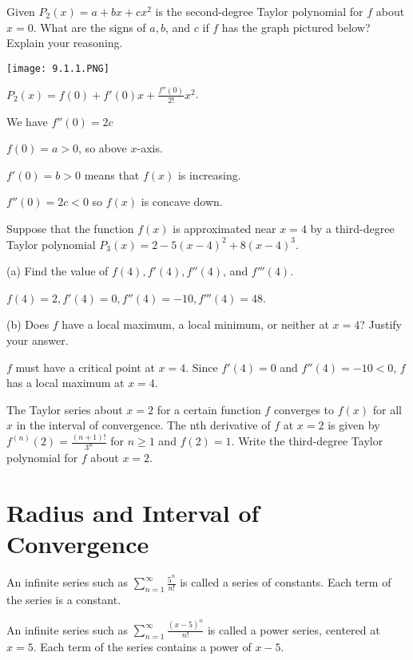 \documentclass[../bccalc.tex]{subfiles}
\begin{document}
\begin{example}
    Given $P_2(x)=a+bx+cx^2$ is the second-degree Taylor polynomial for $f$ about $x=0$. What are the signs of $a,b$, and $c$ if $f$ has the graph pictured below? Explain your reasoning.
    \begin{center}
        \texttt{[image: 9.1.1.PNG]}
    \end{center}

    $P_2(x)=f(0)+f'(0)x+\frac{f''(0)}{2!}x^2$.

    We have $f''(0)=2c$

    $f(0)=a>0$, so above $x$-axis.

    $f'(0)=b>0$ means that $f(x)$ is increasing.

    $f''(0)=2c<0$ so $f(x)$ is concave down.
\end{example}

\begin{example}
    Suppose that the function $f(x)$ is approximated near $x=4$ by a third-degree Taylor polynomial $P_3(x)=2-5(x-4)^2+8(x-4)^3$.

    (a) Find the value of $f(4), f'(4), f''(4)$, and $f'''(4)$.

    $f(4)=2, f'(4)=0, f''(4)=-10, f'''(4)=48$.

    (b) Does $f$ have a local maximum, a local minimum, or neither at $x=4$? Justify your answer.

    $f$ must have a critical point at $x=4$. Since $f'(4)=0$ and $f''(4)=-10<0$, $f$ has a local maximum at $x=4$.
\end{example}

\ex The Taylor series about $x=2$ for a certain function $f$ converges to $f(x)$ for all $x$ in the interval of convergence. The nth derivative of $f$ at $x=2$ is given by $f^{(n)}(2)=\frac{(n+1)!}{3^n}$ for $n\geq 1$ and $f(2)=1$. Write the third-degree Taylor polynomial for $f$ about $x=2$.

\section{Radius and Interval of Convergence}
An infinite series such as $\sum_{n=1}^{\infty} \frac{5^n}{n!}$ is called a series of constants. Each term of the series is a constant.

An infinite series such as $\sum_{n=1}^{\infty} \frac{(x-5)^n}{n!}$ is called a power series, centered at $x=5$. Each term of the series contains a power of $x-5$.
\end{document}

